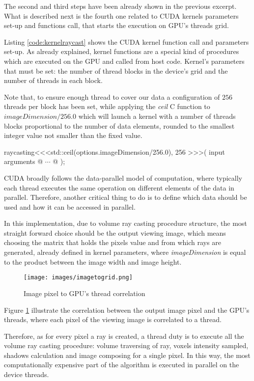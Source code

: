 \documentclass[12pt,a4paper]{extarticle}
\newcommand{\linespace}{\vspace{0pt}}
\begin{document}
The second and third steps have been already shown in the previous excerpt. What is described next is the fourth one related to CUDA kernels parameters set-up and functions call, that starts the execution on GPU's threads grid.
\linespace

Listing \ref{code:kernelraycast} shows the CUDA kernel function call and parameters set-up. As already explained, kernel functions are a special kind of procedures which are executed on the GPU and called from host code. Kernel's parameters that must be set: the number of thread blocks in the device's grid and the number of threads in each block. 

Note that, to ensure enough thread to cover our data a configuration of $256$ threads per block has been set, while applying the \textit{ceil} C function to $imageDimension/256.0$ which will launch a kernel with a number of threads blocks proportional to the number of data elements, rounded to the smallest integer value not smaller than the fixed value.

\begin{cpp}[label=code:kernelraycast]
raycasting<<<std::ceil(options.imageDimension/256.0), 256 >>>( 
	input arguments @ $\cdots$ @
	);	
\end{cpp}

CUDA broadly follows the data-parallel model of computation, where typically each thread executes the same operation on different elements of the data in parallel. Therefore, another critical thing to do is to define which data should be used and how it can be accessed in parallel.

In this implementation, due to volume ray casting procedure structure, the most straight forward choice should be the output viewing image, which means choosing the matrix that holds the pixels value and from which rays are generated, already defined in kernel parameters, where \textit{imageDimension} is equal to the product between the image width and image height.

\begin{figure}[hbtp]
\centering
\texttt{[image: images/imagetogrid.png]}
\caption{Image pixel to GPU's thread correlation}
\label{fig:imagetogrid}
\end{figure}

Figure \ref{fig:imagetogrid} illustrate the correlation between the output image pixel and the GPU's threads, where each pixel of the viewing image is correlated to a thread. 

Therefore, as for every pixel a ray is created, a thread duty is to execute all the volume ray casting procedure: volume traversing of ray, voxels intensity sampled, shadows calculation and image composing for a single pixel.
In this way, the most computationally expensive part of the algorithm is executed in parallel on the device threads.
\linespace
\end{document}
